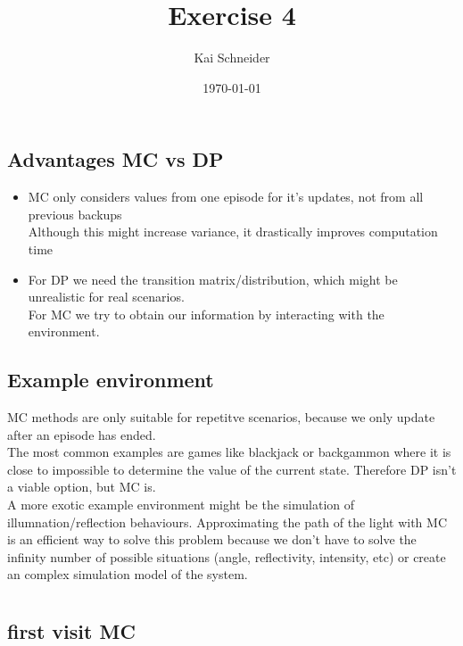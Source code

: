 \documentclass[11pt,a4paper]{article}
\title{Exercise 4}
\author{Kai Schneider}
\date{\today}
\begin{document}
 

\maketitle

\section{}

\subsection{Advantages MC vs DP}

\begin{itemize}
    \item MC only considers values from one episode for it's updates, not from all previous backups\\
    Although this might increase variance, it drastically improves computation time
    \item For DP we need the transition matrix/distribution, which might be unrealistic for real 
    scenarios.\\
    For MC we try to obtain our information by interacting with the environment. 
\end{itemize}

\subsection{Example environment}
MC methods are only suitable for repetitve scenarios, because we only update after an episode has ended.\\
The most common examples are games like blackjack or backgammon where it is close to impossible to 
determine the value of the current state. Therefore DP isn't a viable option, but MC is.\\
A more exotic example environment might be the simulation of illumnation/reflection behaviours. Approximating the
path of the light with MC is an efficient way to solve this problem because we don't have to solve
the infinity number of possible situations (angle, reflectivity, intensity, etc) or create an complex
simulation model of the system.


\section{}

\subsection{first visit MC}
\end{document}
